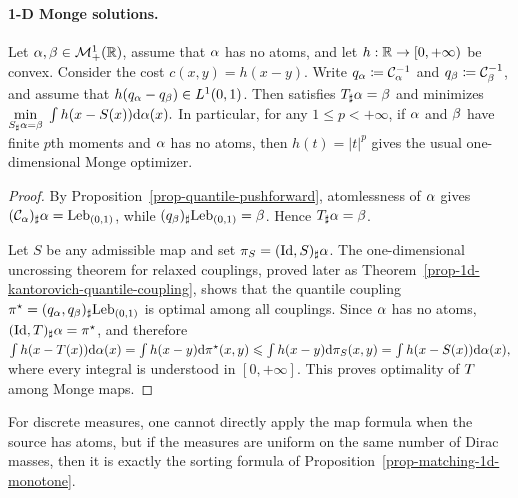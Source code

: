 \paragraph{1-D Monge solutions.}\label{par-1d-monge-solution}
\begin{thm}\label{prop-1d-quantile-map}
Let $\alpha,\beta\in\mathcal{M}_+^1(\mathbb{R})$, assume that $\alpha$ has no atoms, and let $h:\mathbb{R}\to[0,+\infty)$ be convex. Consider the cost $c(x,y)=h(x-y)$. Write $q_\alpha\coloneqq\mathcal{C}_{\alpha}^{-1}$ and $q_\beta\coloneqq\mathcal{C}_{\beta}^{-1}$, and assume that $h(q_\alpha-q_\beta)\in L^1(0,1)$. Then
satisfies $T_\sharp\alpha=\beta$ and minimizes
\(\underset{S_\sharp\alpha=\beta}{\min}\;\int h(x-S(x))\mathrm{d}\alpha(x).\)
In particular, for any $1\leq p<+\infty$, if $\alpha$ and $\beta$ have finite $p$th moments and $\alpha$ has no atoms, then $h(t)=|t|^p$ gives the usual one-dimensional Monge optimizer.
\end{thm}
\begin{proof}
By Proposition~\ref{prop-quantile-pushforward}, atomlessness of $\alpha$ gives $(\mathcal{C}_{\alpha})_\sharp\alpha=\mathrm{Leb}_{(0,1)}$, while $(q_\beta)_\sharp\mathrm{Leb}_{(0,1)}=\beta$. Hence $T_\sharp\alpha=\beta$.

Let $S$ be any admissible map and set $\pi_S=(\mathrm{Id},S)_\sharp\alpha$. The one-dimensional uncrossing theorem for relaxed couplings, proved later as Theorem~\ref{prop-1d-kantorovich-quantile-coupling}, shows that the quantile coupling $\pi^\star=(q_\alpha,q_\beta)_\sharp\mathrm{Leb}_{(0,1)}$ is optimal among all couplings. Since $\alpha$ has no atoms, $(\mathrm{Id},T)_\sharp\alpha=\pi^\star$, and therefore
\(\int h(x-T(x))\mathrm{d}\alpha(x) = \int h(x-y)\mathrm{d}\pi^\star(x,y) \leqslant \int h(x-y)\mathrm{d}\pi_S(x,y) = \int h(x-S(x))\mathrm{d}\alpha(x),\)
where every integral is understood in $[0,+\infty]$. This proves optimality of $T$ among Monge maps.
\end{proof}
For discrete measures, one cannot directly apply the map formula when the source has atoms, but if the measures are uniform on the same number of Dirac masses, then it is exactly the sorting formula of Proposition~\ref{prop-matching-1d-monotone}.

